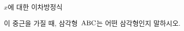 $x$에 대한 이차방정식 \par\smallskip{}\par\smallskip\noindent 이 중근을 가질 때, 삼각형~$\mathrm{ABC}$는 어떤 삼각형인지 \mbox{말하시오.}
